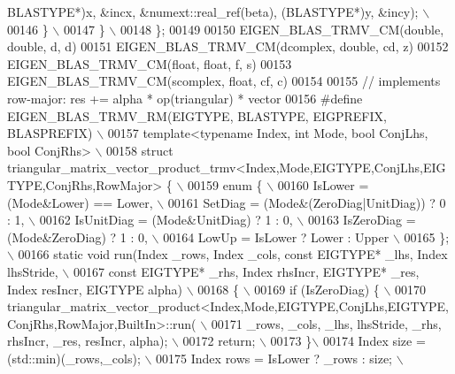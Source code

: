 \begin{DoxyCode}
{       BLASTYPE*)x, &incx, &numext::real\_ref(beta), (BLASTYPE*)y, &incy); \(\backslash\)}
00146 \textcolor{preprocessor}{   \} \(\backslash\)}
00147 \textcolor{preprocessor}{  \} \(\backslash\)}
00148 \textcolor{preprocessor}{\};}
00149 
00150 EIGEN\_BLAS\_TRMV\_CM(\textcolor{keywordtype}{double},   \textcolor{keywordtype}{double}, d,  d)
00151 EIGEN\_BLAS\_TRMV\_CM(dcomplex, \textcolor{keywordtype}{double}, cd, z)
00152 EIGEN\_BLAS\_TRMV\_CM(\textcolor{keywordtype}{float},    \textcolor{keywordtype}{float},  f,  s)
00153 EIGEN\_BLAS\_TRMV\_CM(scomplex, \textcolor{keywordtype}{float},  cf, c)
00154 
00155 \textcolor{comment}{// implements row-major: res += alpha * op(triangular) * vector}
00156 \textcolor{preprocessor}{#define EIGEN\_BLAS\_TRMV\_RM(EIGTYPE, BLASTYPE, EIGPREFIX, BLASPREFIX) \(\backslash\)}
00157 \textcolor{preprocessor}{template<typename Index, int Mode, bool ConjLhs, bool ConjRhs> \(\backslash\)}
00158 \textcolor{preprocessor}{struct triangular\_matrix\_vector\_product\_trmv<Index,Mode,EIGTYPE,ConjLhs,EIGTYPE,ConjRhs,RowMajor> \{ \(\backslash\)}
00159 \textcolor{preprocessor}{  enum \{ \(\backslash\)}
00160 \textcolor{preprocessor}{    IsLower = (Mode&Lower) == Lower, \(\backslash\)}
00161 \textcolor{preprocessor}{    SetDiag = (Mode&(ZeroDiag|UnitDiag)) ? 0 : 1, \(\backslash\)}
00162 \textcolor{preprocessor}{    IsUnitDiag  = (Mode&UnitDiag) ? 1 : 0, \(\backslash\)}
00163 \textcolor{preprocessor}{    IsZeroDiag  = (Mode&ZeroDiag) ? 1 : 0, \(\backslash\)}
00164 \textcolor{preprocessor}{    LowUp = IsLower ? Lower : Upper \(\backslash\)}
00165 \textcolor{preprocessor}{  \}; \(\backslash\)}
00166 \textcolor{preprocessor}{ static void run(Index \_rows, Index \_cols, const EIGTYPE* \_lhs, Index lhsStride, \(\backslash\)}
00167 \textcolor{preprocessor}{                 const EIGTYPE* \_rhs, Index rhsIncr, EIGTYPE* \_res, Index resIncr, EIGTYPE alpha) \(\backslash\)}
00168 \textcolor{preprocessor}{ \{ \(\backslash\)}
00169 \textcolor{preprocessor}{   if (IsZeroDiag) \{ \(\backslash\)}
00170 \textcolor{preprocessor}{     triangular\_matrix\_vector\_product<Index,Mode,EIGTYPE,ConjLhs,EIGTYPE,ConjRhs,RowMajor,BuiltIn>::run( \(\backslash\)}
00171 \textcolor{preprocessor}{       \_rows, \_cols, \_lhs, lhsStride, \_rhs, rhsIncr, \_res, resIncr, alpha); \(\backslash\)}
00172 \textcolor{preprocessor}{     return; \(\backslash\)}
00173 \textcolor{preprocessor}{   \}\(\backslash\)}
00174 \textcolor{preprocessor}{   Index size = (std::min)(\_rows,\_cols); \(\backslash\)}
00175 \textcolor{preprocessor}{   Index rows = IsLower ? \_rows : size; \(\backslash\)}

\end{DoxyCode}
